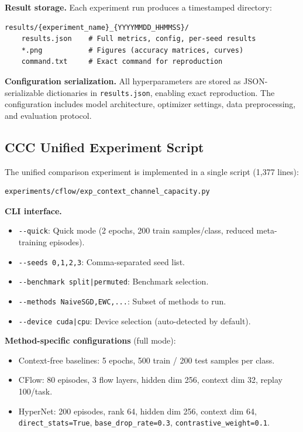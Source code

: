 \documentclass{article}
\begin{document}
\textbf{Result storage.}
Each experiment run produces a timestamped directory:
\begin{verbatim}
results/{experiment_name}_{YYYYMMDD_HHMMSS}/
    results.json    # Full metrics, config, per-seed results
    *.png           # Figures (accuracy matrices, curves)
    command.txt     # Exact command for reproduction
\end{verbatim}

\textbf{Configuration serialization.}
All hyperparameters are stored as JSON-serializable dictionaries in \texttt{results.json}, enabling exact reproduction. The configuration includes model architecture, optimizer settings, data preprocessing, and evaluation protocol.


\subsection{CCC Unified Experiment Script}
\label{app:ccc_script}

The unified comparison experiment is implemented in a single script (1,377 lines):
\begin{verbatim}
experiments/cflow/exp_context_channel_capacity.py
\end{verbatim}

\textbf{CLI interface.}
\begin{itemize}
    \item \texttt{-{}-quick}: Quick mode (2 epochs, 200 train samples/class, reduced meta-training episodes).
    \item \texttt{-{}-seeds 0,1,2,3}: Comma-separated seed list.
    \item \texttt{-{}-benchmark split|permuted}: Benchmark selection.
    \item \texttt{-{}-methods NaiveSGD,EWC,...}: Subset of methods to run.
    \item \texttt{-{}-device cuda|cpu}: Device selection (auto-detected by default).
\end{itemize}

\textbf{Method-specific configurations} (full mode):
\begin{itemize}
    \item Context-free baselines: 5 epochs, 500 train / 200 test samples per class.
    \item CFlow: 80 episodes, 3 flow layers, hidden dim 256, context dim 32, replay 100/task.
    \item HyperNet: 200 episodes, rank 64, hidden dim 256, context dim 64, \texttt{direct\_stats=True}, \texttt{base\_drop\_rate=0.3}, \texttt{contrastive\_weight=0.1}.
\end{itemize}
\end{document}
